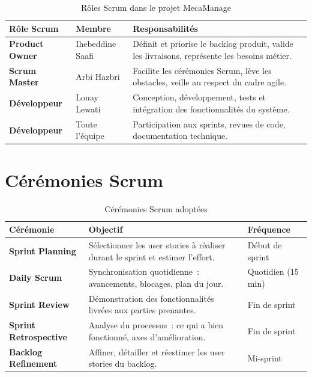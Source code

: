 \documentclass[12pt,a4paper]{report}
\begin{document}
\begin{table}[H]
\centering
\caption{R\^{o}les Scrum dans le projet MecaManage}
\renewcommand{\arraystretch}{1.4}
\begin{tabularx}{\textwidth}{|l|l|X|}
\hline
\rowcolor{primary!20}
\textbf{R\^{o}le Scrum} & \textbf{Membre} & \textbf{Responsabilit\'{e}s} \\
\hline
\textbf{Product Owner} & Ihebeddine Saafi &
  D\'{e}finit et priorise le backlog produit, valide les livraisons,
  repr\'{e}sente les besoins m\'{e}tier. \\
\hline
\textbf{Scrum Master} & Arbi Hazbri &
  Facilite les c\'{e}r\'{e}monies Scrum, lève les obstacles,
  veille au respect du cadre agile. \\
\hline
\textbf{D\'{e}veloppeur} & Louay Lewati &
  Conception, d\'{e}veloppement, tests et int\'{e}gration des
  fonctionnalit\'{e}s du syst\`{e}me. \\
\hline
\textbf{D\'{e}veloppeur} & Toute l'\'{e}quipe &
  Participation aux sprints, revues de code, documentation technique. \\
\hline
\end{tabularx}
\end{table}

\section{C\'{e}r\'{e}monies Scrum}

\begin{table}[H]
\centering
\caption{C\'{e}r\'{e}monies Scrum adopt\'{e}es}
\renewcommand{\arraystretch}{1.4}
\begin{tabularx}{\textwidth}{|l|X|l|}
\hline
\rowcolor{primary!20}
\textbf{C\'{e}r\'{e}monie} & \textbf{Objectif} & \textbf{Fr\'{e}quence} \\
\hline
\textbf{Sprint Planning} &
  S\'{e}lectionner les user stories \`{a} r\'{e}aliser durant le sprint
  et estimer l'effort. & D\'{e}but de sprint \\
\hline
\textbf{Daily Scrum} &
  Synchronisation quotidienne~: avancements, blocages, plan du jour. &
  Quotidien (15 min) \\
\hline
\textbf{Sprint Review} &
  D\'{e}monstration des fonctionnalit\'{e}s livr\'{e}es aux parties
  prenantes. & Fin de sprint \\
\hline
\textbf{Sprint Retrospective} &
  Analyse du processus~: ce qui a bien fonctionn\'{e}, axes
  d'am\'{e}lioration. & Fin de sprint \\
\hline
\textbf{Backlog Refinement} &
  Affiner, d\'{e}tailler et r\'{e}estimer les user stories du backlog. &
  Mi-sprint \\
\hline
\end{tabularx}
\end{table}
\end{document}
